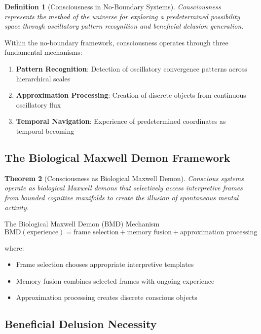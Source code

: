\documentclass[11pt,a4paper]{article}
\newtheorem{theorem}{Theorem}[section]
\newtheorem{definition}[theorem]{Definition}
\theoremstyle{remark}
\begin{document}
\begin{definition}[Consciousness in No-Boundary Systems]
Consciousness represents the method of the universe for exploring a predetermined possibility space through oscillatory pattern recognition and beneficial delusion generation.
\end{definition}

Within the no-boundary framework, consciousness operates through three fundamental mechanisms:

\begin{enumerate}
\item \textbf{Pattern Recognition}: Detection of oscillatory convergence patterns across hierarchical scales
\item \textbf{Approximation Processing}: Creation of discrete objects from continuous oscillatory flux
\item \textbf{Temporal Navigation}: Experience of predetermined coordinates as temporal becoming
\end{enumerate}

\subsection{The Biological Maxwell Demon Framework}

\begin{theorem}[Consciousness as Biological Maxwell Demon]
Conscious systems operate as biological Maxwell demons that selectively access interpretive frames from bounded cognitive manifolds to create the illusion of spontaneous mental activity.
\end{theorem}

The Biological Maxwell Demon (BMD) Mechanism
\begin{equation}
\text{BMD}(\text{experience}) = \text{frame selection} + \text{memory fusion} + \text{approximation processing}
\end{equation}

where:
\begin{itemize}
\item Frame selection chooses appropriate interpretive templates
\item Memory fusion combines selected frames with ongoing experience
\item Approximation processing creates discrete conscious objects
\end{itemize}

\subsection{Beneficial Delusion Necessity}
\end{document}
